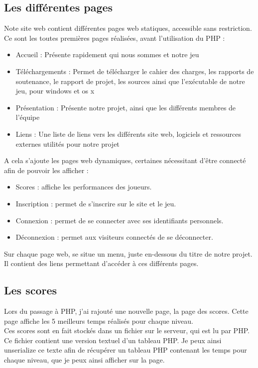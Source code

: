 \documentclass[12pt]{article}
\begin{document}
\subsection{Les différentes pages}

Note site web contient différentes pages web statiques,  accessible sans restriction. Ce sont les toutes premières pages réalisées, avant l'utilisation du PHP :

\begin{itemize}
\item Accueil : Présente rapidement qui nous sommes et notre jeu
\item Téléchargements : Permet de télécharger le cahier des charges, les rapports de soutenance, le rapport de projet, les sources ainsi que l'exécutable de notre jeu, pour windows et os x
\item Présentation : Présente notre projet, ainsi que les différents membres de l'équipe
\item Liens : Une liste de liens vers les différents site web, logiciels et ressources externes utilités pour notre projet
\end{itemize}

A cela s'ajoute les pages web dynamiques, certaines nécessitant d'être connecté afin de pouvoir les afficher :

\begin{itemize}
\item Scores : affiche les performances des joueurs.
\item Inscription : permet de s'inscrire sur le site et le jeu.
\item Connexion : permet de se connecter avec ses identifiants personnels.
\item Déconnexion : permet aux visiteurs connectés de se déconnecter.
\end{itemize}

Sur chaque page web, se situe un menu, juste en-dessous du titre de notre projet. Il contient des liens permettant d'accéder à ces différents pages.

\subsection{Les scores}

Lors du passage à PHP, j'ai rajouté une nouvelle page, la page des scores. Cette page affiche les 5 meilleurs temps réalisés pour chaque niveau.\\
Ces scores sont en fait stockés dans un fichier sur le serveur, qui est lu par PHP. Ce fichier contient une version textuel d'un tableau PHP. Je peux ainsi \gls{unserialize} ce texte afin de récupérer un tableau PHP contenant les temps pour chaque niveau, que je peux ainsi afficher sur la page.\\
\end{document}
